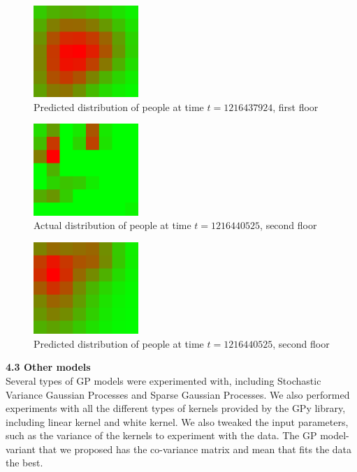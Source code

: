 \documentclass[letterpaper]{article}
\begin{document}
\begin{figure}[h!]
  \centering
    \includegraphics[width=150px,natwidth=320,natheight=280]{selected_renders/0_1216437924p.png}
  \caption{Predicted distribution of people at time $t=1216437924$, first floor}
  \label{fig:t2dist}
\end{figure}

\begin{figure}[h!]
  \centering
    \includegraphics[width=150px,natwidth=320,natheight=280]{selected_renders/1_1216440525.png}
  \caption{Actual distribution of people at time $t=1216440525$, second floor}
  \label{fig:t3dist}
\end{figure}

\begin{figure}[h!]
  \centering
    \includegraphics[width=150px,natwidth=320,natheight=280]{selected_renders/1_1216440525p.png}
  \caption{Predicted distribution of people at time $t=1216440525$, second floor}
  \label{fig:t4dist}
\end{figure}


{\bf4.3  Other models} \\

Several types of GP models were experimented with, including Stochastic Variance Gaussian Processes and Sparse Gaussian Processes. We also performed experiments with all the different types of kernels provided by the GPy library, including linear kernel and white kernel. We also tweaked the input parameters, such as the variance of the kernels to experiment with the data. The GP model-variant that we proposed has the co-variance matrix and mean that fits the data the best. \\
\end{document}
